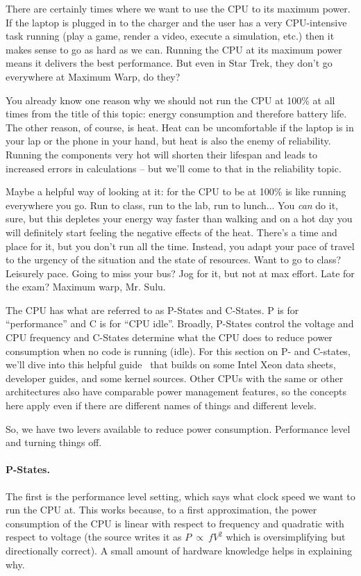 There are certainly times where we want to use the CPU to its maximum power. If the laptop is plugged in to the charger and the user has a very CPU-intensive task running (play a game, render a video, execute a simulation, etc.) then it makes sense to go as hard as we can. Running the CPU at its maximum power means it delivers the best performance. But even in Star Trek, they don't go everywhere at Maximum Warp, do they?

You already know one reason why we should not run the CPU at 100\% at all times from the title of this topic: energy consumption and therefore battery life. The other reason, of course, is heat. Heat can be uncomfortable if the laptop is in your lap or the phone in your hand, but heat is also the enemy of reliability. Running the components very hot will shorten their lifespan and leads to increased errors in calculations -- but we'll come to that in the reliability topic.

Maybe a helpful way of looking at it: for the CPU to be at 100\% is like running everywhere you go. Run to class, run to the lab, run to lunch... You \textit{can} do it, sure, but this depletes your energy way faster than walking and on a hot day you will definitely start feeling the negative effects of the heat. There's a time and place for it, but you don't run all the time. Instead, you adapt your pace of travel to the urgency of the situation and the state of resources. Want to go to class? Leisurely pace. Going to miss your bus? Jog for it, but not at max effort. Late for the exam? Maximum warp, Mr. Sulu. 

The CPU has what are referred to as P-States and C-States. P is for ``performance'' and C is for ``CPU idle''. Broadly, P-States control the voltage and CPU frequency and C-States determine what the CPU does to reduce power consumption when no code is running (idle). For this section on P- and C-states, we'll dive into this helpful guide~\cite{cpu-power} that builds on some Intel Xeon data sheets, developer guides, and some kernel sources. Other CPUs with the same or other architectures also have comparable power management features, so the concepts here apply even if there are different names of things and different levels.

So, we have two levers available to reduce power consumption. Performance level and turning things off.

\paragraph{P-States.} The first is the performance level setting, which says what clock speed we want to run the CPU at. This works because, to a first approximation, the power consumption of the CPU is linear with respect to frequency and quadratic with respect to voltage (the source writes it as $P ~\propto~f V^{2}$ which is oversimplifying but directionally correct). A small amount of hardware knowledge helps in explaining why.


